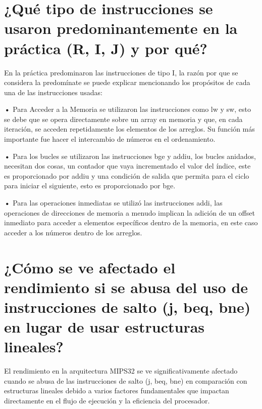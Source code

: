 \documentclass{article}
\begin{document}
\section{¿Qué tipo de instrucciones se usaron predominantemente en la práctica (R, I, J) y por qué?}

\quad

{ En la práctica predominaron las instrucciones de tipo I, la razón por que se considera la predomínate se puede explicar mencionando los propósitos de cada una de las instrucciones usadas:}

\quad

\textbf{•   } { Para Acceder a la Memoria se utilizaron las instrucciones como lw y sw, esto se debe que se opera directamente sobre un array en memoria y que, en cada iteración, se acceden repetidamente los elementos de los arreglos. Su función más importante fue hacer el intercambio de números en el ordenamiento.}

\quad

\textbf{•   } { Para los bucles se utilizaron las instrucciones bge y addiu, los bucles anidados, necesitan dos cosas, un contador que vaya incrementado el valor del índice, este es proporcionado por addiu y una condición de salida que permita para el ciclo para iniciar el siguiente, esto es proporcionado por bge.}

\quad

\textbf{•   } { Para las operaciones inmediatas se utilizó las instrucciones   addi, las operaciones de direcciones de memoria a menudo implican la adición de un offset inmediato para acceder a elementos específicos dentro de la memoria, en este caso acceder a los números dentro de los arreglos.}

\quad
\newpage









\section{¿Cómo se ve afectado el rendimiento si se abusa del uso de instrucciones de salto (j, beq, bne) en lugar de usar estructuras lineales?}

\quad

{ El rendimiento en la arquitectura MIPS32 se ve significativamente afectado cuando se abusa de las instrucciones de salto (j, beq, bne) en comparación con estructuras lineales debido a varios factores fundamentales que impactan directamente en el flujo de ejecución y la eficiencia del procesador.}
\end{document}
